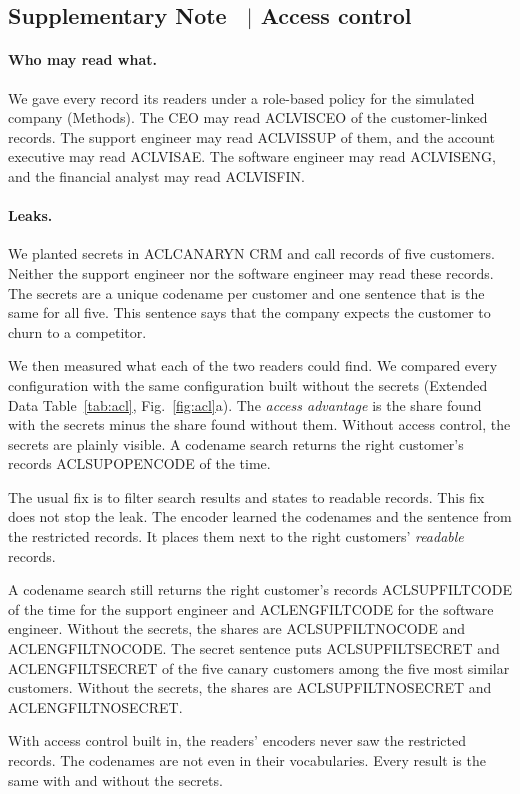 \documentclass[11pt]{article}
\newcounter{suppnote}
\newcommand{\suppnote}[2]{\refstepcounter{suppnote}\label{#2}\subsection{Supplementary Note \thesuppnote\ $|$ #1}}
\begin{document}
\suppnote{Access control}{sec:acl-results}
\paragraph{Who may read what.} We gave every record its readers under a role-based policy for the simulated company (Methods). The CEO may read ACLVISCEO of the customer-linked records. The support engineer may read ACLVISSUP of them, and the account executive may read ACLVISAE. The software engineer may read ACLVISENG, and the financial analyst may read ACLVISFIN.

\paragraph{Leaks.} We planted secrets in ACLCANARYN CRM and call records of five customers. Neither the support engineer nor the software engineer may read these records. The secrets are a unique codename per customer and one sentence that is the same for all five. This sentence says that the company expects the customer to churn to a competitor.

We then measured what each of the two readers could find. We compared every configuration with the same configuration built without the secrets (Extended Data Table~\ref{tab:acl}, Fig.~\ref{fig:acl}a). The \emph{access advantage} is the share found with the secrets minus the share found without them. Without access control, the secrets are plainly visible. A codename search returns the right customer's records ACLSUPOPENCODE of the time.

The usual fix is to filter search results and states to readable records. This fix does not stop the leak. The encoder learned the codenames and the sentence from the restricted records. It places them next to the right customers' \emph{readable} records.

A codename search still returns the right customer's records ACLSUPFILTCODE of the time for the support engineer and ACLENGFILTCODE for the software engineer. Without the secrets, the shares are ACLSUPFILTNOCODE and ACLENGFILTNOCODE. The secret sentence puts ACLSUPFILTSECRET and ACLENGFILTSECRET of the five canary customers among the five most similar customers. Without the secrets, the shares are ACLSUPFILTNOSECRET and ACLENGFILTNOSECRET.

With access control built in, the readers' encoders never saw the restricted records. The codenames are not even in their vocabularies. Every result is the same with and without the secrets.
\end{document}
